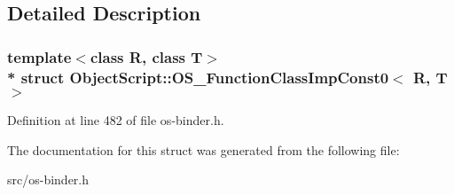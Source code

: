 \subsection{Detailed Description}
\subsubsection*{template$<$class R, class T$>$\\*
struct Object\+Script\+::\+O\+S\+\_\+\+Function\+Class\+Imp\+Const0$<$ R, T $>$}



Definition at line 482 of file os-\/binder.\+h.



The documentation for this struct was generated from the following file\+:\begin{DoxyCompactItemize}
\item 
src/os-\/binder.\+h\end{DoxyCompactItemize}
